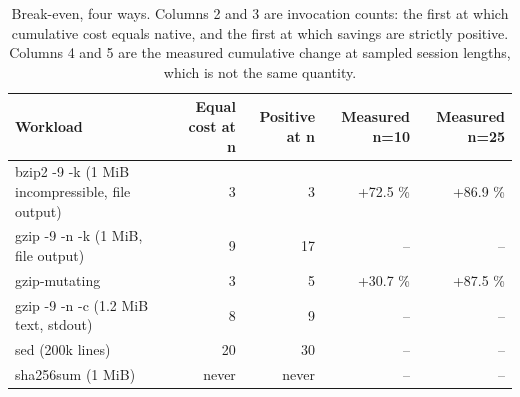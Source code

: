 \begin{table}[t]
\centering
\small
\caption{Break-even, four ways. Columns 2 and 3 are invocation counts: the first at which cumulative cost equals native, and the first at which savings are strictly positive. Columns 4 and 5 are the measured cumulative change at sampled session lengths, which is not the same quantity.}
\label{tab:break_even}
\begin{tabular}{lrrrr}
\toprule
\textbf{Workload} & \textbf{Equal cost at n} & \textbf{Positive at n} & \textbf{Measured n=10} & \textbf{Measured n=25} \\
\midrule
bzip2 -9 -k (1 MiB incompressible, file output) & 3 & 3 & +72.5 \% & +86.9 \% \\
gzip -9 -n -k (1 MiB, file output) & 9 & 17 & -- & -- \\
gzip-mutating & 3 & 5 & +30.7 \% & +87.5 \% \\
gzip -9 -n -c (1.2 MiB text, stdout) & 8 & 9 & -- & -- \\
sed (200k lines) & 20 & 30 & -- & -- \\
sha256sum (1 MiB) & never & never & -- & -- \\
\bottomrule
\end{tabular}
\end{table}
